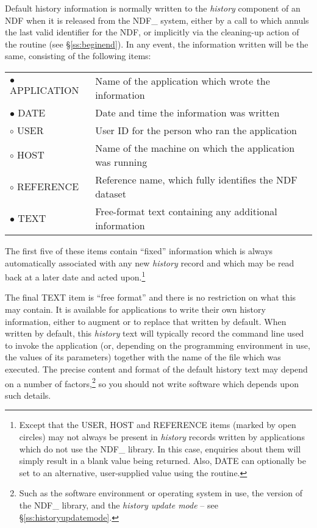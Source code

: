 \documentclass[twoside,11pt,nolof]{starlink}
\providecommand{\st}[1]{{\emph{#1}}}
\begin{document}
Default history information is normally written to the \st{history\/}
component of an NDF when it is released from the NDF\_ system, either
by a call to  which annuls the last valid identifier for the
NDF, or implicitly via the cleaning-up action of the  routine
(see \S\ref{ss:beginend}). In any event, the information written will be the
same, consisting of the following items:

\begin{center}
\begin{tabular}{l@{ -- }l}
$\bullet$ APPLICATION & Name of the application which wrote the information\\
$\bullet$ DATE & Date and time the information was written\\
$\circ$ USER & User ID for the person who ran the application\\
$\circ$ HOST & Name of the machine on which the application was running\\
$\circ$ REFERENCE & Reference name, which fully identifies the NDF
dataset\\[1ex]
$\bullet$ TEXT & Free-format text containing any additional information
\end{tabular}
\end{center}

The first five of these items contain ``fixed'' information which is
always automatically associated with any new \st{history\/} record and
which may be read back at a later date and acted upon.\footnote{Except
that the USER, HOST and REFERENCE items (marked by open circles) may
not always be present in \st{history\/} records written by applications
which do not use the NDF\_ library. In this case, enquiries about them
will simply result in a blank value being returned. Also, DATE can
optionally be set to an alternative, user-supplied value using the
 routine.}

The final TEXT item is ``free format'' and there is no restriction on
what this may contain. It is available for applications to write their
own history information, either to augment or to replace that written
by default.  When written by default, this \st{history\/} text will
typically record the command line used to invoke the application (or,
depending on the programming environment in use, the values of its
parameters) together with the name of the file which was executed.
The precise content and format of the default history text may depend
on a number of factors,\footnote{Such as the software environment or
operating system in use, the version of the NDF\_ library, and the
\st{history update mode\/} -- see \S\ref{ss:historyupdatemode}.} so you
should not write software which depends upon such details.
\end{document}
